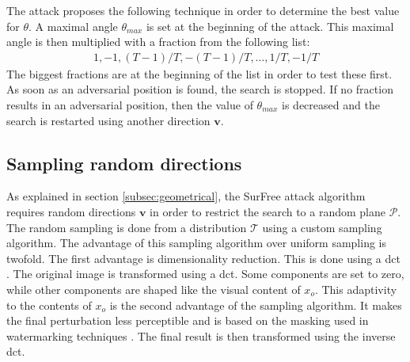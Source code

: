 The attack proposes the following technique in order to determine the best value for $\theta$. A maximal angle $\theta_{max}$ is set at the beginning of the attack. This maximal angle is then multiplied with a fraction from the following list:
\begin{align*}
1, -1, (T - 1)/T, -(T-1)/T, \ldots, 1/T, -1/T
\end{align*}
The biggest fractions are at the beginning of the list in order to test these first. As soon as an adversarial position is found, the search is stopped. If no fraction results in an adversarial position, then the value of $\theta_{max}$ is decreased and the search is restarted using another direction $\mathbf{v}$.

\subsection{Sampling random directions}\label{sec:surfree_direction_sampling}
As explained in section \ref{subsec:geometrical}, the SurFree attack \cite{surfree} algorithm requires random directions $\mathbf{v}$ in order to restrict the search to a random plane $\mathcal{P}$. The random sampling is done from a distribution $\mathcal{T}$ using a custom sampling algorithm. The advantage of this sampling algorithm over uniform sampling is twofold. The first advantage is dimensionality reduction. This is done using a \gls{dct} \cite{dct}. The original image is transformed using a \gls{dct}. Some components are set to zero, while other components are shaped like the visual content of $x_o$. This adaptivity to the contents of $x_o$ is the second advantage of the sampling algorithm. It makes the final perturbation less perceptible and is based on the masking used in watermarking techniques \cite{watermarking}. The final result is then transformed using the inverse \gls{dct}.


